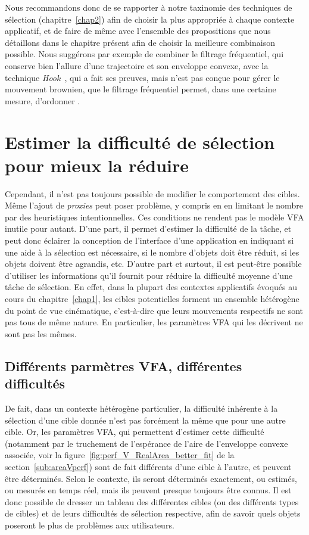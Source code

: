 	Nous recommandons donc de se rapporter à notre taxinomie des techniques de sélection (chapitre~\ref{chap2}) afin de choisir la plus appropriée à chaque contexte applicatif, et de faire de même avec l'ensemble des propositions que nous détaillons dans le chapitre présent afin de choisir la meilleure combinaison possible. Nous suggérons par exemple de combiner le filtrage fréquentiel, qui conserve bien l'allure d'une trajectoire et son enveloppe convexe, avec la technique \emph{Hook}~\cite{ortega2013hook}, qui a fait ses preuves, mais n'est pas conçue pour gérer le mouvement brownien, que le filtrage fréquentiel permet, dans une certaine mesure, \og d'ordonner \fg{}.

\section{Estimer la difficulté de sélection pour mieux la réduire}
	Cependant, il n'est pas toujours possible de modifier le comportement des cibles. Même l'ajout de \emph{proxies} peut poser problème, y compris en en limitant le nombre par des heuristiques intentionnelles. Ces conditions ne rendent pas le modèle VFA inutile pour autant. D'une part, il permet d'estimer la difficulté de la tâche, et peut donc éclairer la conception de l'interface d'une application en indiquant si une aide à la sélection est nécessaire, si le nombre d'objets doit être réduit, si les objets doivent être agrandis, etc. D'autre part et surtout, il est peut-être possible d'utiliser les informations qu'il fournit pour réduire la difficulté moyenne d'une tâche de sélection. En effet, dans la plupart des contextes applicatifs évoqués au cours du chapitre~\ref{chap1}, les cibles potentielles forment un ensemble hétérogène du point de vue cinématique, c'est-à-dire que leurs mouvements respectifs ne sont pas tous de même nature. En particulier, les paramètres VFA qui les décrivent ne sont pas les mêmes.
	
	\subsection{Différents parmètres VFA, différentes difficultés}
	De fait, dans un contexte hétérogène particulier, la difficulté inhérente à la sélection d'une cible donnée n'est pas forcément la même que pour une autre cible. Or, les paramètres VFA, qui permettent d'estimer cette difficulté (notamment par le truchement de l'espérance de l'aire de l'enveloppe convexe associée, voir la figure~\ref{fig:perf_V_RealArea_better_fit} de la section~\ref{sub:areaVperf}) sont de fait différents d'une cible à l'autre, et peuvent être déterminés. Selon le contexte, ils seront déterminés exactement, ou estimés, ou mesurés en temps réel, mais ils peuvent presque toujours être connus. Il est donc possible de dresser un tableau des différentes cibles (ou des différents types de cibles) et de leurs difficultés de sélection respective, afin de savoir quels objets poseront le plus de problèmes aux utilisateurs.
	
